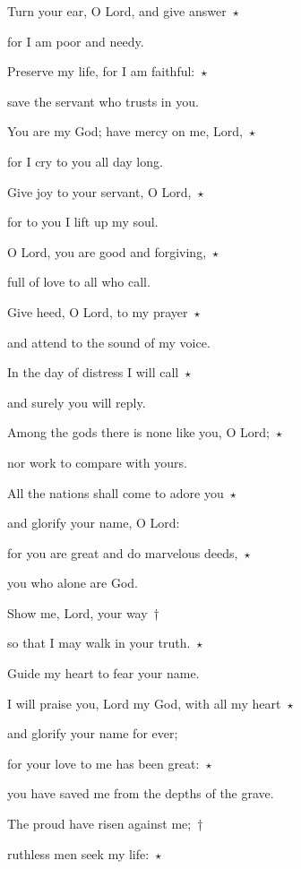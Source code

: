 \noindent Turn your ear, O Lord, and give answer~$\star$~\nopagebreak

for I am poor and needy.

\noindent Preserve my life, for I am faithful:~$\star$~\nopagebreak

save the servant who trusts in you.

\noindent You are my God; have mercy on me, Lord,~$\star$~\nopagebreak

for I cry to you all day long.

\noindent Give joy to your servant, O Lord,~$\star$~\nopagebreak

for to you I lift up my soul.

\noindent O Lord, you are good and forgiving,~$\star$~\nopagebreak

full of love to all who call.

\noindent Give heed, O Lord, to my prayer~$\star$~\nopagebreak

and attend to the sound of my voice.

\noindent In the day of distress I will call~$\star$~\nopagebreak

and surely you will reply.

\noindent Among the gods there is none like you, O Lord;~$\star$~\nopagebreak

nor work to compare with yours.

\noindent All the nations shall come to adore you~$\star$~\nopagebreak

and glorify your name, O Lord:

\noindent for you are great and do marvelous deeds,~$\star$~\nopagebreak

you who alone are God.

\noindent Show me, Lord, your way~†~\nopagebreak

so that I may walk in your truth.~$\star$~\nopagebreak

Guide my heart to fear your name.

\noindent I will praise you, Lord my God, with all my heart~$\star$~\nopagebreak

and glorify your name for ever;

\noindent for your love to me has been great:~$\star$~\nopagebreak

you have saved me from the depths of the grave.

\noindent The proud have risen against me;~†~\nopagebreak

ruthless men seek my life:~$\star$~\nopagebreak

